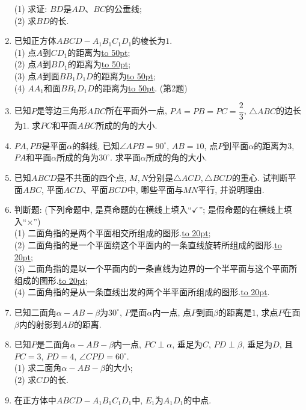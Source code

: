 \documentclass[10pt,a4paper]{article}
\newcommand{\blank}[1]{\underline{\hbox to #1pt{}}}
\begin{document}
\begin{enumerate}[1.]
(1) 求证: $BD$是$AD$、$BC$的公垂线;\\
(2) 求$BD$的长.
\item 已知正方体$ABCD-A_1B_1C_1D_1$的棱长为$1$.\\
(1) 点$A$到$CD_1$的距离为\blank{50};\\
(2) 点$A$到$BD_1$的距离为\blank{50};\\
(3) 点$A$到面$BB_1D_1D$的距离为\blank{50};\\
(4) $AA_1$和面$BB_1D_1D$的距离为\blank{50}.
(第2题)
\item 已知$P$是等边三角形$ABC$所在平面外一点, $PA=PB=PC=\dfrac 23$, $\triangle ABC$的边长为$1$. 求$PC$和平面$ABC$所成的角的大小.
\item $PA, PB$是平面$\alpha$的斜线, 已知$\angle APB=90^\circ$, $AB=10$, 点$P$到平面$\alpha$的距离为$3$, $PA$和平面$\alpha$所成的角为$30^\circ$. 求平面$\alpha$所成的角的大小.
\item 已知$ABCD$是不共面的四个点, $M,N$分别是$\triangle ACD,\triangle BCD$的重心. 试判断平面$ABC$, 平面$ACD$、平面$BCD$中, 哪些平面与$MN$平行, 并说明理由.
\item 判断题: (下列命题中, 是真命题的在横线上填入``$\checkmark$''; 是假命题的在横线上填入``$\times$'')\\
(1) 二面角指的是两个平面相交所组成的图形.\blank{20};\\
(2) 二面角指的是一个平面绕这个平面内的一条直线旋转所组成的图形.\blank{20};\\
(3) 二面角指的是以一个平面内的一条直线为边界的一个半平面与这个平面所组成的图形.\blank{20};\\
(4) 二面角指的是从一条直线出发的两个半平面所组成的图形.\blank{20}.
\item 已知二面角$\alpha -AB-\beta$为$30^\circ$, $P$是面$\alpha$内一点, 点$P$到面$\beta$的距离是$1$, 求点$P$在面$\beta$内的射影到$AB$的距离.
\item 已知$P$是二面角$\alpha -AB-\beta$内一点, $PC\perp \alpha$, 垂足为$C$, $PD\perp \beta$, 垂足为$D$, 且$PC=3$, $PD=4$, $\angle CPD=60^\circ$.\\
(1) 求二面角$\alpha -AB-\beta$的大小;\\
(2) 求$CD$的长.
\item 在正方体中$ABCD-A_1B_1C_1D_1$中, $E_1$为$A_1D_1$的中点.
\begin{center}
\end{center}
\end{enumerate}
\end{document}
